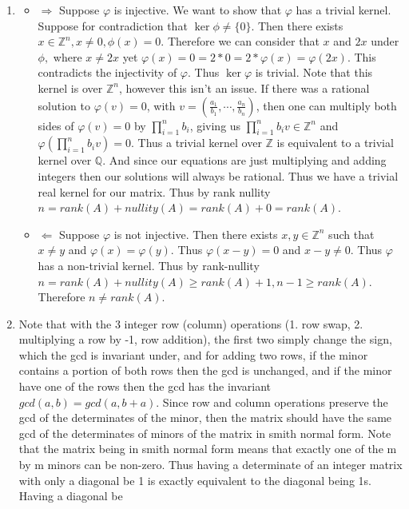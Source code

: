 \documentclass[12pt, letterpaper]{article}
\newcommand{\Z}{\mathbb{Z}}
\newcommand{\Q}{\mathbb{Q}}
\begin{document}
\begin{enumerate}
	\begin{enumerate}
		\item 
		\begin{itemize}
			\item $\Rightarrow$ Suppose $\varphi$ is injective.  We want to show that 
			$\varphi$ has a trivial kernel.  Suppose for contradiction that 
			$\ker \phi \neq \{0\}$.  Then there exists 
			$x \in \Z^n, x \neq 0, \phi(x) = 0$.  Therefore we can consider that 
			$x$ and $2x$ under $\phi,$ where $x \neq 2x$ yet 
			$\varphi(x) = 0 = 2*0 = 2* \varphi(x) = \varphi(2x)$.  
			This contradicts the injectivity of $\varphi$.  Thus $\ker \varphi$ 
			is trivial.  Note that this kernel is over $\Z^n$, however this isn't
			an issue. If there was a rational solution to $\varphi(v) = 0$, with 
			$v = (\frac{a_1}{b_1},\cdots, \frac{a_n}{b_n})$, then one can multiply
			both sides of $\varphi(v) = 0$ by $\prod_{i=1}^n b_i$, giving us 
			$\prod_{i=1}^n b_i v \in \Z^n$ and $\varphi(\prod_{i=1}^n b_i v) = 0$.
			Thus a trivial kernel over $\Z$ is equivalent to a trivial kernel over
			$\Q$.  And since our equations are just multiplying and adding integers
			then our solutions will always be rational.  Thus we have a trivial 
			real kernel for our matrix.  
			Thus by rank nullity $n = rank(A) + nullity(A) = rank(A) + 0 = rank(A).$
			\item $\Leftarrow$ Suppose $\varphi$ is not injective.  Then there 
			exists $x,y \in \Z^n$ such that $x \neq y$ and 
			$\varphi(x) = \varphi(y)$.
			Thus $\varphi(x-y) = 0$ and $x-y \neq 0$.  
			Thus $\varphi$ has a non-trivial	kernel.  Thus by rank-nullity 
			$n = rank(A) + nullity(A) \geq rank(A) + 1, n-1 \geq rank(A)$.  
			Therefore $n \neq rank(A)$.  
		\end{itemize}
		\item Note that with the 3 integer row (column) operations (1. row swap, 2. multiplying a row by -1, row addition), the first two simply change the sign, 
		which the gcd is invariant under, and for adding two rows, if the minor 
		contains a portion of both rows then the gcd is unchanged, and if the 
		minor have one of the rows then the gcd has the invariant $gcd(a,b) = gcd(a, b+a)$.  Since row and column operations preserve the gcd of the determinates 
		of the minor, then the matrix should have the same gcd of the determinates
		of minors of the matrix in smith normal form.  Note that the matrix being
		in smith normal form means that exactly one of the m by m minors can be 
		non-zero.  Thus having a determinate of an integer matrix with only a diagonal be 1 is exactly equivalent to the diagonal being 1s.  Having a diagonal be

\end{enumerate}
\end{enumerate}
\end{document}
